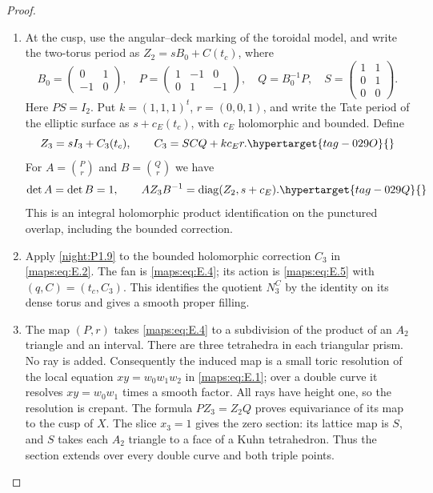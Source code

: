 \documentclass[11pt,a4paper]{article}
\numberwithin{equation}{section}
\theoremstyle{definition}
\begin{document}
\begin{proof}
\begin{enumerate}[label=\arabic*.,leftmargin=*]
\item At the cusp, use the angular--deck marking of the toroidal model, and write the two-torus period as
$Z_2=sB_0+C(t_c)$, where
\[
 B_0=\begin{pmatrix}0&1\\-1&0\end{pmatrix},\quad
 P=\begin{pmatrix}1&-1&0\\0&1&-1\end{pmatrix},\quad
 Q=B_0^{-1}P,\quad
 S=\begin{pmatrix}1&1\\0&1\\0&0\end{pmatrix}.
\]
Here $PS=I_2$.  Put $k=(1,1,1)^t$, $r=(0,0,1)$, and write the Tate
period of the elliptic surface as $s+c_E(t_c)$, with $c_E$ holomorphic
and bounded.  Define
\begin{equation}
 Z_3=sI_3+C_3(t_c),\qquad
 C_3=SCQ+kc_Er.
 \hypertarget{tag-029O}{}\label{maps:eq:E.2}
\end{equation}
For $A=\binom{P}{r}$ and $B=\binom{Q}{r}$ we have
\begin{equation}
 \det A=\det B=1,\qquad
 AZ_3B^{-1}=\operatorname{diag}(Z_2,s+c_E).
 \hypertarget{tag-029Q}{}\label{maps:eq:E.3}
\end{equation}
This is an integral holomorphic product identification on the punctured overlap, including the bounded correction.

\item Apply \cref{night:P1.9} to the bounded holomorphic correction $C_3$ in \eqref{maps:eq:E.2}.
The fan is \eqref{maps:eq:E.4}; its action is \eqref{maps:eq:E.5} with $(q,C)=(t_c,C_3)$.
This identifies the quotient $N_3^C$ by the identity on its dense torus and gives a smooth proper filling.

\item The map $(P,r)$ takes \eqref{maps:eq:E.4} to a subdivision of the product of an
$A_2$ triangle and an interval.  There are three tetrahedra in each
triangular prism.  No ray is added.  Consequently the induced map is
a small toric resolution of the local equation
$xy=w_0w_1w_2$ in \eqref{maps:eq:E.1}; over a double curve it resolves
$xy=w_0w_1$ times a smooth factor.  All rays have height one, so the
resolution is crepant.  The formula $PZ_3=Z_2Q$ proves equivariance
of its map to the cusp of $X$.  The slice $x_3=1$ gives the zero
section: its lattice map is $S$, and $S$ takes each $A_2$ triangle
to a face of a Kuhn tetrahedron.  Thus the section extends over every
double curve and both triple points.


\end{enumerate}
\end{proof}
\end{document}
